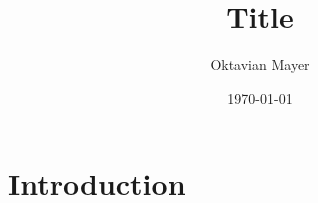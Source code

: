 \documentclass[11pt,a4paper]{article}
\title{Title}
\author{Oktavian Mayer}
\date{\today}
\begin{document}
\maketitle

\section{Introduction}
\end{document}
